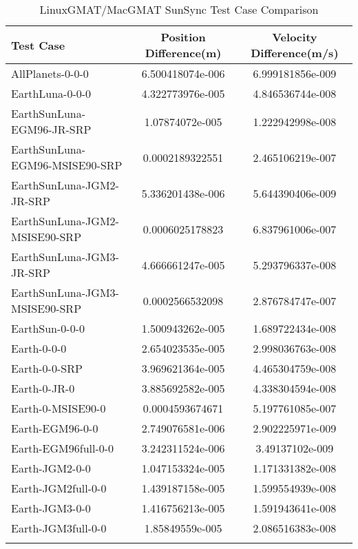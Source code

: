 \begin{table}[htbp!]
\centering
\caption{ LinuxGMAT/MacGMAT SunSync Test Case Comparison}
      \begin{tabular}{lcc}
      \hline\hline
          Test Case & Position Difference(m) & Velocity Difference(m/s) \\
         \hline
         AllPlanets-0-0-0 & 6.500418074e-006 & 6.999181856e-009 \\
         EarthLuna-0-0-0 & 4.322773976e-005 & 4.846536744e-008 \\
         EarthSunLuna-EGM96-JR-SRP & 1.07874072e-005 & 1.222942998e-008 \\
         EarthSunLuna-EGM96-MSISE90-SRP & 0.0002189322551 & 2.465106219e-007 \\
         EarthSunLuna-JGM2-JR-SRP & 5.336201438e-006 & 5.644390406e-009 \\
         EarthSunLuna-JGM2-MSISE90-SRP & 0.0006025178823 & 6.837961006e-007 \\
         EarthSunLuna-JGM3-JR-SRP & 4.666661247e-005 & 5.293796337e-008 \\
         EarthSunLuna-JGM3-MSISE90-SRP & 0.0002566532098 & 2.876784747e-007 \\
         EarthSun-0-0-0 & 1.500943262e-005 & 1.689722434e-008 \\
         Earth-0-0-0 & 2.654023535e-005 & 2.998036763e-008 \\
         Earth-0-0-SRP & 3.969621364e-005 & 4.465304759e-008 \\
         Earth-0-JR-0 & 3.885692582e-005 & 4.338304594e-008 \\
         Earth-0-MSISE90-0 & 0.0004593674671 & 5.197761085e-007 \\
         Earth-EGM96-0-0 & 2.749076581e-006 & 2.902225971e-009 \\
         Earth-EGM96full-0-0 & 3.242311524e-006 & 3.49137102e-009 \\
         Earth-JGM2-0-0 & 1.047153324e-005 & 1.171331382e-008 \\
         Earth-JGM2full-0-0 & 1.439187158e-005 & 1.599554939e-008 \\
         Earth-JGM3-0-0 & 1.416756213e-005 & 1.591943641e-008 \\
         Earth-JGM3full-0-0 & 1.85849559e-005 & 2.086516383e-008 \\
      \hline\hline
      \label{Table: SunSync LinuxGMAT-MacGMAT Table} 
\end{tabular}
\end{table}
